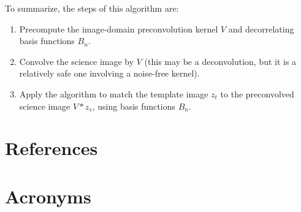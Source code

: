 \documentclass[DM,authoryear,toc]{lsstdoc}
\newcommand{\AL}{\citetalias{1998ApJ...503..325A}}
\begin{document}
To summarize, the steps of this algorithm are:
\begin{enumerate}
  \item Precompute the image-domain preconvolution kernel $V$ and decorrelating basis functions $B_n$.
  \item Convolve the science image by $V$ (this may be a deconvolution, but it is a relatively safe one involving a noise-free kernel).
  \item Apply the \AL{} algorithm to match the template image $z_t$ to the preconvolved science image $V \ast z_s$, using basis functions $B_n$.
\end{enumerate}

\appendix
\section{References} \label{sec:bib}
\renewcommand{\refname}{} %


\section{Acronyms} \label{sec:acronyms}

\end{document}
